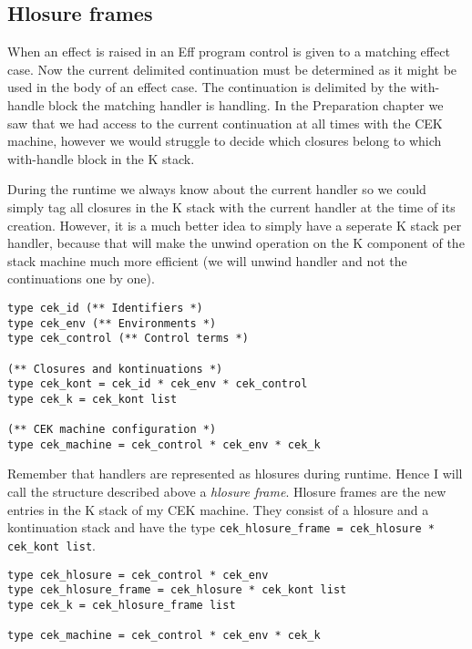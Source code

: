 \documentclass[class=article, crop=false]{standalone}
\begin{document}
\subsection{Hlosure frames}

When an effect is raised in an Eff program control is given to a matching effect case.
Now the current delimited continuation must be determined as it might be used in the body
of an effect case. The continuation is delimited by the with-handle block the matching
handler is handling. In the Preparation chapter we saw that we had access to the current
continuation at all times with the CEK machine, however we would struggle to decide which
closures belong to which with-handle block in the K stack.

During the runtime we always know about the current handler so we could simply tag all
closures in the K stack with the current handler at the time of its creation. However,
it is a much better idea to simply have a seperate K stack per handler, because
that will make the unwind operation on the K component of the stack machine much more efficient
(we will unwind handler and not the continuations one by one).

\begin{minipage}{.9\textwidth}
\begin{center}
\begin{lstlisting}[language=caml]
type cek_id (** Identifiers *)
type cek_env (** Environments *)
type cek_control (** Control terms *)

(** Closures and kontinuations *)
type cek_kont = cek_id * cek_env * cek_control
type cek_k = cek_kont list

(** CEK machine configuration *)
type cek_machine = cek_control * cek_env * cek_k
\end{lstlisting}
\end{center}
\end{minipage}

Remember that handlers are represented as hlosures during runtime. Hence I will call the
structure described above a \emph{hlosure frame}. Hlosure frames are the new entries in
the K stack of my CEK machine. They consist of a hlosure and a kontinuation stack and
have the type \verb|cek_hlosure_frame = cek_hlosure * cek_kont list|.

\begin{lstlisting}[language=caml]
type cek_hlosure = cek_control * cek_env
type cek_hlosure_frame = cek_hlosure * cek_kont list
type cek_k = cek_hlosure_frame list

type cek_machine = cek_control * cek_env * cek_k
\end{lstlisting}
\end{document}

